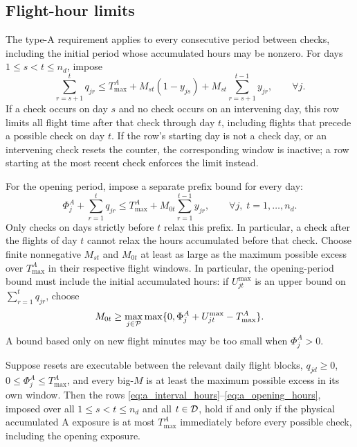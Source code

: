 \subsection{Flight-hour limits}

The type-A requirement applies to every consecutive period between checks,
including the initial period whose accumulated hours may be nonzero. For
days $1\le s<t\le n_d$, impose
\begin{equation}\label{eq:a_interval_hours}
  \sum_{r=s+1}^{t}q_{jr}
  \le T^A_{\max}
    +M_{st}(1-y_{js})
    +M_{st}\sum_{r=s+1}^{t-1}y_{jr},
  \qquad \forall j.
\end{equation}
If a check occurs on day $s$ and no check occurs on an intervening day, this
row limits all flight time after that check through day $t$, including flights
that precede a possible check on day $t$. If the row's starting day is not a
check day, or an intervening check resets the counter, the corresponding
window is inactive; a row starting at the most recent check enforces the
limit instead.

For the opening period, impose a separate prefix bound for every day:
\begin{equation}\label{eq:a_opening_hours}
  \Phi^A_j+\sum_{r=1}^{t}q_{jr}
  \le T^A_{\max}
    +M_{0t}\sum_{r=1}^{t-1}y_{jr},
  \qquad \forall j,\; t=1,\ldots,n_d.
\end{equation}
Only checks on days strictly before $t$ relax this prefix. In particular, a
check after the flights of day $t$ cannot relax the hours accumulated before
that check. Choose finite nonnegative $M_{st}$ and $M_{0t}$ at least as large
as the maximum possible excess over $T^A_{\max}$ in their respective flight
windows. In particular, the opening-period bound must include the initial
accumulated hours: if $U^{\max}_{jt}$ is an upper bound on
$\sum_{r=1}^{t}q_{jr}$, choose
\[
  M_{0t}\ge \max_{j\in\mathcal{P}}
  \max\{0,\Phi^A_j+U^{\max}_{jt}-T^A_{\max}\}.
\]
A bound based only on new flight minutes may be too small when
$\Phi^A_j>0$.

\begin{proposition}
  \label{prop:a_hour_exactness}
  Suppose resets are executable between the relevant daily flight blocks,
  $q_{jd}\ge0$, $0\le\Phi^A_j\le T^A_{\max}$, and every big-$M$ is at least
  the maximum possible excess in its own window. Then the rows
  \eqref{eq:a_interval_hours}--\eqref{eq:a_opening_hours}, imposed over all
  $1\le s<t\le n_d$ and all $t\in\mathcal{D}$, hold if and only if the physical
  accumulated A exposure is at most $T^A_{\max}$ immediately before every
  possible check, including the opening exposure.
\end{proposition}

